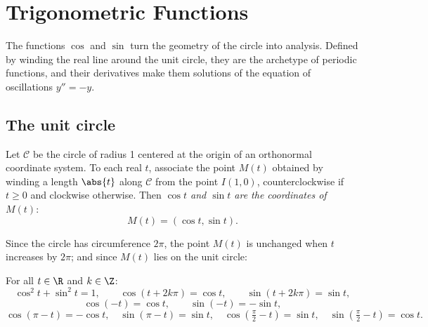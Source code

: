 \chapter{Trigonometric Functions}\label{ch:tle:trigo}

The functions $\cos$ and $\sin$ turn the geometry of the circle into
analysis. Defined by winding the real line around the unit circle, they are
the archetype of periodic functions, and their derivatives make them
solutions of the equation of oscillations $y'' = -y$.

\section{The unit circle}

\begin{definition}\label{def:tle:trigo:cossin}
Let $\mathcal{C}$ be the circle of radius 1 centered at the origin of an
orthonormal coordinate system. To each real $t$, associate the point $M(t)$
obtained by winding a length $\abs{t}$ along $\mathcal{C}$ from the point
$I(1,0)$, counterclockwise if $t \geq 0$ and clockwise otherwise. Then
\emph{$\cos t$ and $\sin t$ are the coordinates of
$M(t)$}:
\[
M(t) = (\cos t, \sin t).
\]
\end{definition}

\begin{omfigure}
\end{omfigure}

Since the circle has circumference $2\pi$, the point $M(t)$ is unchanged when
$t$ increases by $2\pi$; and since $M(t)$ lies on the unit circle:

\begin{proposition}\label{prop:tle:trigo:identities}
For all $t \in \R$ and $k \in \Z$:
\[
\cos^2 t + \sin^2 t = 1, \qquad
\cos(t + 2k\pi) = \cos t, \qquad
\sin(t + 2k\pi) = \sin t,
\]
\[
\cos(-t) = \cos t, \qquad \sin(-t) = -\sin t,
\]
\[
\cos(\pi - t) = -\cos t, \quad \sin(\pi - t) = \sin t, \quad
\cos\left(\tfrac{\pi}{2} - t\right) = \sin t, \quad
\sin\left(\tfrac{\pi}{2} - t\right) = \cos t .
\]
\end{proposition}

